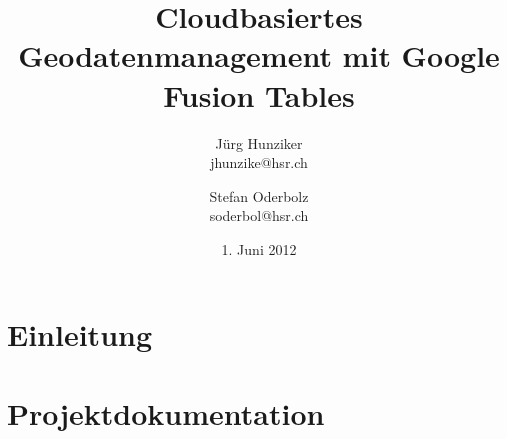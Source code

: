 


\title{Cloudbasiertes Geodatenmanagement mit Google Fusion Tables}
\author{Jürg Hunziker\\jhunzike@hsr.ch
		\and
		Stefan Oderbolz\\soderbol@hsr.ch}
\date{1. Juni 2012}















\tableofcontents

\cleardoublepage


\part{Einleitung}


\cleardoublepage

\part{Projektdokumentation}


\cleardoublepage


